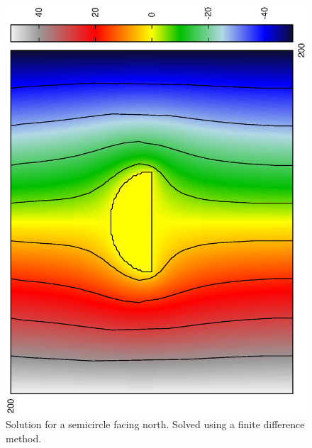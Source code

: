 \documentclass[aps,twocolumn,pre,nofootinbib,10pt]{revtex4-1}
\begin{document}
\begin{figure}[h]
\includegraphics*[height=\breite \columnwidth,angle=270]{semicircle.ps} 
\caption{Solution for a semicircle facing north. Solved using a finite difference method.}
\end{figure}
\end{document}
